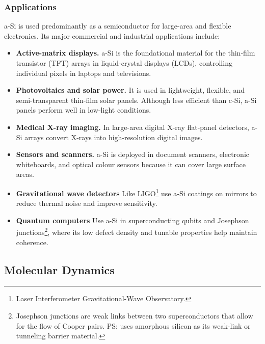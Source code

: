 \documentclass{article}
\begin{document}
\subsubsection{Applications}
a-Si is used predominantly as a semiconductor for large-area and flexible electronics. Its major commercial and industrial applications include:
\begin{itemize}
    \item \textbf{Active-matrix displays.} a-Si is the foundational material for the thin-film transistor (TFT) arrays in liquid-crystal displays (LCDs), controlling individual pixels in laptops and televisions.
    \item \textbf{Photovoltaics and solar power.} It is used in lightweight, flexible, and semi-transparent thin-film solar panels. Although less efficient than c-Si, a-Si panels perform well in low-light conditions.
    \item \textbf{Medical X-ray imaging.} In large-area digital X-ray flat-panel detectors, a-Si arrays convert X-rays into high-resolution digital images.
    \item \textbf{Sensors and scanners.} a-Si is deployed in document scanners, electronic whiteboards, and optical colour sensors because it can cover large surface areas.
    \item \textbf{Gravitational wave detectors} Like LIGO\footnote{Laser Interferometer Gravitational-Wave Observatory.} use a-Si coatings on mirrors to reduce thermal noise and improve sensitivity.
    \item \textbf{Quantum computers} Use a-Si in superconducting qubits and Josephson junctions\footnote{Josephson junctions are weak links between two superconductors that allow for the flow of Cooper pairs. PS: uses amorphous silicon as its weak-link or tunneling barrier material.}, where its low defect density and tunable properties help maintain coherence.
\end{itemize}

\subsection{Molecular Dynamics}
\end{document}
